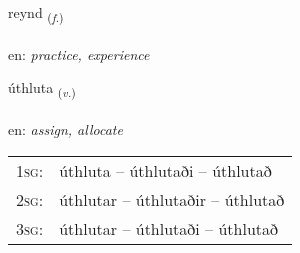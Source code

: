 \documentclass[frontgrid, backgrid]{flacards}\usepackage[]{graphicx}\usepackage[]{xcolor}
\begin{document}
\renewcommand{\flhead}{\vskip5pt \fboxsep=0pt {\small\bfseries\footnotesize Nafnorð | Noun}}
\renewcommand{\fcfoot}{\vskip5pt \fboxsep=0pt \hspace{2pt}{\small\bfseries\footnotesize 3K}}

\renewcommand{\blhead}{\vskip5pt {\small\bfseries\footnotesize Nafnorð | Noun }}
\renewcommand{\bcfoot}{\vskip5pt \hspace{2pt}{\small\bfseries\footnotesize 3K}}


{reynd \small{\textsubscript{(\textit{f.})}} \\[1ex] %
\textphonetic{[reint]} \\
en: \emph{practice, experience} \\  [2ex]
\renewcommand*{\arraystretch}{0.8}
}

\renewcommand{\flhead}{\vskip5pt \fboxsep=0pt {\small\bfseries\footnotesize Sagnorð | Verb}}
\renewcommand{\fcfoot}{\vskip5pt \fboxsep=0pt \hspace{2pt}{\small\bfseries\footnotesize 3K}}

\renewcommand{\blhead}{\vskip5pt {\small\bfseries\footnotesize Sagnorð | Verb }}
\renewcommand{\bcfoot}{\vskip5pt \hspace{2pt}{\small\bfseries\footnotesize 3K}}


{úthluta \small{\textsubscript{(\textit{v.})}} \\[1ex] %
 \\
en: \emph{assign, allocate} \\  [2ex]
\renewcommand*{\arraystretch}{0.8}
\begin{tabular}{p{1cm}l}
\textsc{1sg}: & úthluta -- úthlutaði -- úthlutað \\ 
\textsc{2sg}: & úthlutar -- úthlutaðir -- úthlutað \\ 
\textsc{3sg}: & úthlutar -- úthlutaði -- úthlutað \\ 
\end{tabular}
}
\end{document}
